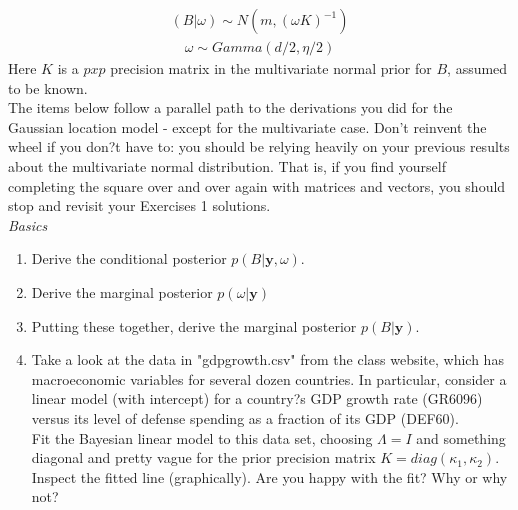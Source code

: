 \documentclass{homework}
\begin{document}
\begin{equation} \begin{split}
(B | \omega) \sim N(m,(\omega K)^{-1}) 
\end{split}\end{equation}
\begin{equation} \begin{split}
\omega \sim Gamma(d/2, \eta/2) 
\end{split}\end{equation}
Here $K$ is a $p x p$ precision matrix in the multivariate normal prior for $B$, assumed to be known.\\
The items below follow a parallel path to the derivations you did for the Gaussian location model - except for the multivariate case. Don't reinvent the wheel if you don?t have to: you should be relying heavily on your previous results about the multivariate normal distribution.   That is, if you find yourself completing the square over and over again with matrices and vectors, you should stop and revisit your Exercises 1 solutions.\\

\textit{Basics}
\begin{enumerate}[label=(\Alph*)]
\item Derive the conditional posterior $p(B | \textbf{y}, \omega)$.

\item Derive the marginal posterior $p(\omega | \textbf{y})$

\item Putting these together, derive the marginal posterior $p(B |  \textbf{y} )$.

\item Take a look at the data in "gdpgrowth.csv" from the class website, which has macroeconomic variables for several dozen countries. In particular, consider a linear model (with intercept) for a country?s GDP growth rate (GR6096) versus its level of defense spending as a fraction of its GDP (DEF60). \\
Fit the Bayesian linear model to this data set, choosing $\Lambda = I$ and something diagonal and pretty vague for the prior precision matrix $K = diag(\kappa_1, \kappa_2)$. Inspect the fitted line (graphically). Are you happy with the fit? Why or why not?

\end{enumerate}
\end{document}
